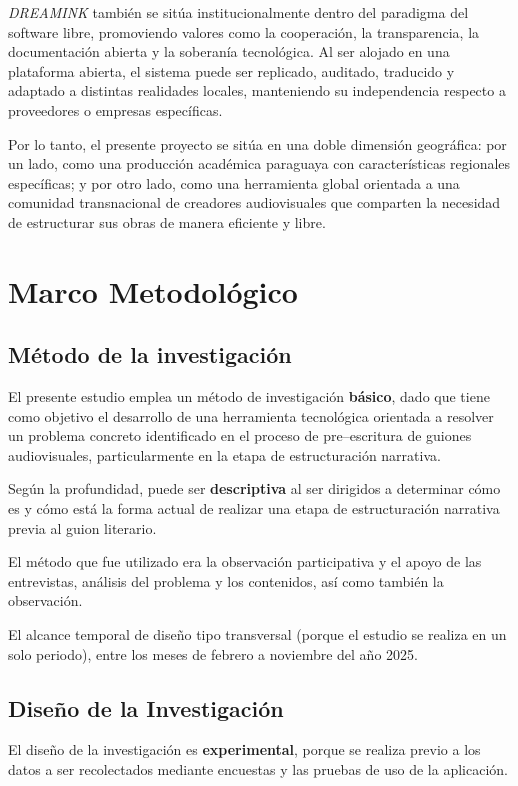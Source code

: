 \documentclass[12pt]{article}
\begin{document}
	\textit{DREAMINK} también se sitúa institucionalmente dentro del paradigma del software libre, promoviendo valores como la cooperación, la transparencia, la documentación abierta y la soberanía tecnológica. Al ser alojado en una plataforma abierta, el sistema puede ser replicado, auditado, traducido y adaptado a distintas realidades locales, manteniendo su independencia respecto a proveedores o empresas específicas.

	Por lo tanto, el presente proyecto se sitúa en una doble dimensión geográfica: por un lado, como una producción académica paraguaya con características regionales específicas; y por otro lado, como una herramienta global orientada a una comunidad transnacional de creadores audiovisuales que comparten la necesidad de estructurar sus obras de manera eficiente y libre.

	\section{Marco Metodológico}

	\subsection{M\'etodo de la investigaci\'on}

	El presente estudio emplea un m\'etodo de investigaci\'on \textbf{básico}, dado que tiene como objetivo el desarrollo de una herramienta tecnol\'ogica orientada a resolver un problema concreto identificado en el proceso de pre--escritura de guiones audiovisuales, particularmente en la etapa de estructuraci\'on narrativa.

	Según la profundidad, puede ser \textbf{descriptiva} al ser dirigidos a determinar cómo es y cómo está la forma actual de realizar una etapa de estructuraci\'on narrativa previa al guion literario.

	El método que fue utilizado era la observación participativa y el apoyo de las entrevistas, análisis del problema y los contenidos, así como también la observación.

	El alcance temporal de diseño tipo transversal (porque el estudio se realiza en un solo periodo), entre los meses de febrero a noviembre del año 2025.

	\subsection{Diseño de la Investigación}

	El diseño de la investigación es \textbf{experimental}, porque se realiza previo a los datos a ser recolectados mediante encuestas y las pruebas de uso de la aplicación.
\end{document}
